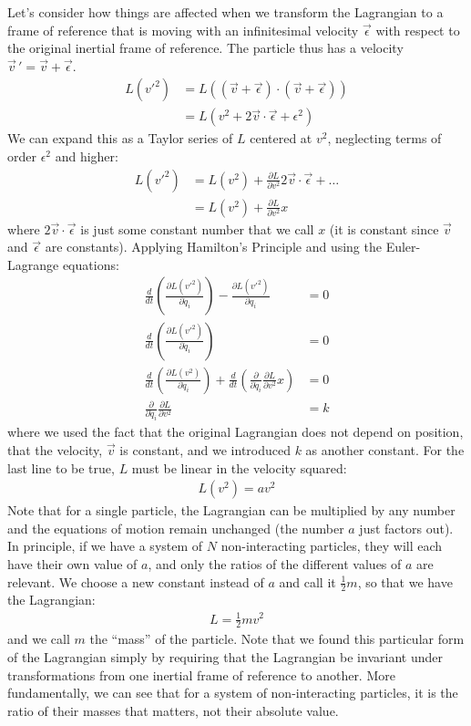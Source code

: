 Let's consider how things are affected when we transform the Lagrangian to a frame of reference that is moving with an infinitesimal velocity $\vec{\epsilon}$ with respect to the original inertial frame of reference. The particle thus has a velocity $\vec{v}\,'=\vec{v}+\vec{\epsilon}$.
\begin{align}
L(v'^2)&=L((\vec{v}+\vec{\epsilon})\cdot(\vec{v}+\vec{\epsilon}))\nonumber\\
&=L(v^2+2\vec{v}\cdot\vec{\epsilon}+\epsilon^2)
\end{align}
We can expand this as a Taylor series of $L$ centered at $v^2$, neglecting terms of order $\epsilon^2$ and higher:
\begin{align}
L(v'^2)&=L(v^2)+\frac{\partial L}{\partial v^2}2\vec{v}\cdot\vec{\epsilon}+\dots\nonumber\\
&=L(v^2)+\frac{\partial L}{\partial v^2}x
\end{align}
where $2\vec{v}\cdot\vec{\epsilon}$ is just some constant number that we call $x$ (it is constant since $\vec{v}$ and $\vec{\epsilon}$ are constants). Applying Hamilton's Principle and using the Euler-Lagrange equations:
\begin{align}
\frac{d}{dt}\left(\frac{\partial L(v'^2)}{\partial \dot{q}_i} \right) - \frac{\partial L(v'^2)}{\partial q_i}&=0\nonumber\\
\frac{d}{dt}\left(\frac{\partial L(v'^2)}{\partial \dot{q}_i} \right)&=0\nonumber\\
\frac{d}{dt}\left(\frac{\partial L(v^2)}{\partial \dot{q}_i} \right)+\frac{d}{dt}\left(\frac{\partial}{\partial \dot{q}_i}\frac{\partial L}{\partial v^2}x \right)&=0\nonumber\\
\frac{\partial}{\partial \dot{q}_i}\frac{\partial L}{\partial v^2}&=k
\end{align}
where we used the fact that the original Lagrangian does not depend on position, that the velocity, $\vec{v}$ is constant, and we introduced $k$ as another constant. For the last line to be true, $L$ must be linear in the velocity squared:
\begin{align}
L(v^2)=av^2
\end{align}
Note that for a single particle, the Lagrangian can be multiplied by any number and the equations of motion remain unchanged (the number $a$ just factors out). In principle, if we have a system of $N$ non-interacting particles, they will each have their own value of $a$, and only the ratios of the different values of $a$ are relevant. 
We choose a new constant instead of $a$ and call it $\frac{1}{2}m$, so that we have the Lagrangian:
\begin{align}
L=\frac{1}{2}mv^2
\end{align}
and we call $m$ the ``mass'' of the particle. Note that we found this particular form of the Lagrangian simply by requiring that the Lagrangian be invariant under transformations from one inertial frame of reference to another. More fundamentally, we can see that for a system of non-interacting particles, it is the ratio of their masses that matters, not their absolute value.

